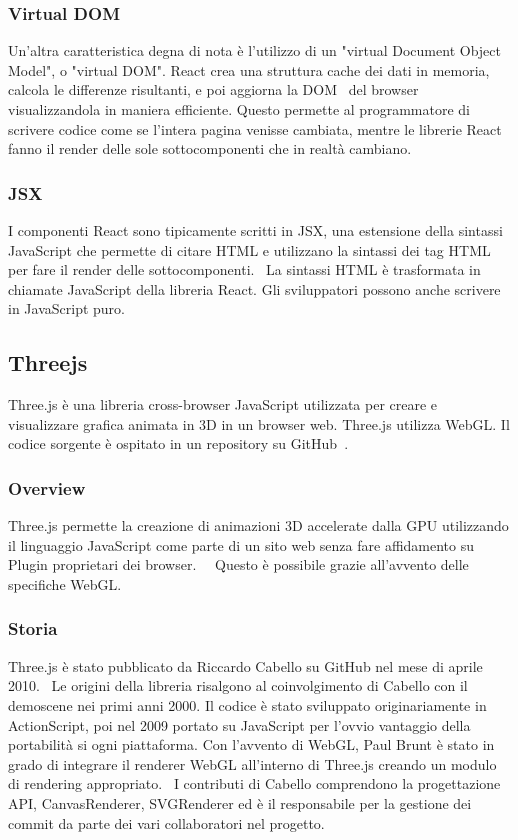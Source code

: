 \subsubsection{Virtual DOM}
Un'altra caratteristica degna di nota è l'utilizzo di un "virtual Document Object Model", o "virtual DOM".
React crea una struttura cache dei dati in memoria, calcola le differenze risultanti, e poi aggiorna
la DOM~\cite{reactdom} del browser visualizzandola in maniera efficiente.
Questo permette al programmatore di scrivere codice come se
l'intera pagina venisse cambiata, mentre le librerie React fanno il render delle sole sottocomponenti che in realtà cambiano.

\subsubsection{JSX}
I componenti React sono tipicamente scritti in JSX, una estensione della sintassi JavaScript che permette di citare
HTML e utilizzano la sintassi dei tag HTML per fare  il render delle sottocomponenti.~\cite{jsx}
La sintassi HTML è trasformata in chiamate JavaScript
della libreria React. Gli sviluppatori possono anche scrivere in JavaScript puro.


\newpage
\subsection{Threejs}
\label{sec:chapter_2_section_3_sub_2}
Three.js \`e una libreria cross-browser JavaScript utilizzata per creare e visualizzare grafica animata in 3D
in un browser web. Three.js utilizza WebGL. Il codice sorgente è ospitato in un repository su GitHub~\cite{github}.

\subsubsection{Overview}
Three.js permette la creazione di animazioni 3D accelerate dalla GPU utilizzando il linguaggio JavaScript
come parte di un sito web senza fare affidamento su Plugin proprietari dei browser.~\cite{O3D}~\cite{unity}
 Questo è possibile grazie all'avvento delle specifiche WebGL.~\cite{khronos}

\subsubsection{Storia}
Three.js è stato pubblicato da Riccardo Cabello su GitHub nel mese di aprile 2010.~\cite{Firstcommit}
Le origini della libreria risalgono al coinvolgimento di Cabello con il demoscene nei primi anni 2000.
Il codice \`e stato sviluppato originariamente in ActionScript, poi nel 2009 portato su JavaScript per l'ovvio vantaggio della
portabilità si ogni piattaforma. Con l'avvento di WebGL, Paul Brunt è stato in grado di integrare il renderer
WebGL all'interno di Three.js creando un modulo di rendering appropriato.~\cite{develop}
I contributi di Cabello comprendono la progettazione API, CanvasRenderer, SVGRenderer ed è il
responsabile per la gestione dei commit da parte dei vari collaboratori nel progetto.

